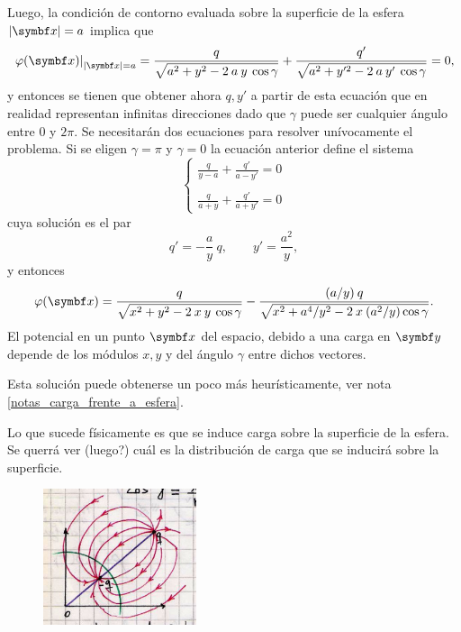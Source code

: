 \documentclass[10pt,oneside]{CBFT_book}
\begin{document}
Luego, la condición de contorno evaluada sobre la superficie de la esfera $|\vb{x}| = a$ implica que 
\[
	\left. \vp(\vbx)\right|_{|\vb{x}| = a} = 
	\frac{q}{\sqrt{ a^2 + y^2 - 2 \: a \: y \:\cos{\gamma}} } +
	\frac{q'}{\sqrt{ a^2 + y'^2 - 2 \: a \: y' \: \cos{\gamma} }} = 0,
\]
y entonces se tienen que obtener ahora $q, y'$ a partir de esta ecuación que en realidad representan
infinitas direcciones dado que $ \gamma $ puede ser cualquier ángulo entre $0$ y $2\pi$.
Se necesitarán dos ecuaciones para resolver unívocamente el problema.
Si se eligen $\gamma = \pi$ y $\gamma = 0$ la ecuación anterior define el sistema
\[
	\begin{cases}
		\displaystyle \frac{q}{y-a} + \frac{q'}{a-y'} = 0 \\
		\\
		\displaystyle  \frac{q}{a+y} + \frac{q'}{a+y'} = 0 
	\end{cases}
\]
cuya solución es el par
\[
	q' = - \frac{a}{y} \: q, \qquad y' = \frac{a^2}{y},
\]
y entonces
\[
	\vp(\vbx) = \frac{q}{\sqrt{ x^2 + y^2 - 2 \: x \: y \:\cos{\gamma}} } -
	\frac{ ( a / y ) \: q }{ \sqrt{ x^2 + a^4 / y^2  - 2 \: x \:  ( a^2 / y ) \cos{\gamma} }}.
\]
El potencial en un punto $\vbx$ del espacio, debido a una carga en $\vb{y}$ depende de los módulos $x, y$ 
y del ángulo $\gamma$ entre dichos vectores.

Esta solución puede obtenerse un poco más heurísticamente, ver nota \ref{notas_carga_frente_a_esfera}.

Lo que sucede físicamente es que se induce carga sobre la superficie de la esfera.
Se querrá ver (luego?) cuál es la distribución de carga que se inducirá sobre la superficie.


\begin{figure}[htb]
	\begin{center}
	\includegraphics[width=0.4\textwidth]{images/fig_ft1_carga_induciendo_en_esfera.jpg}	 
	\end{center}
	\caption{}
\end{figure}
\end{document}
